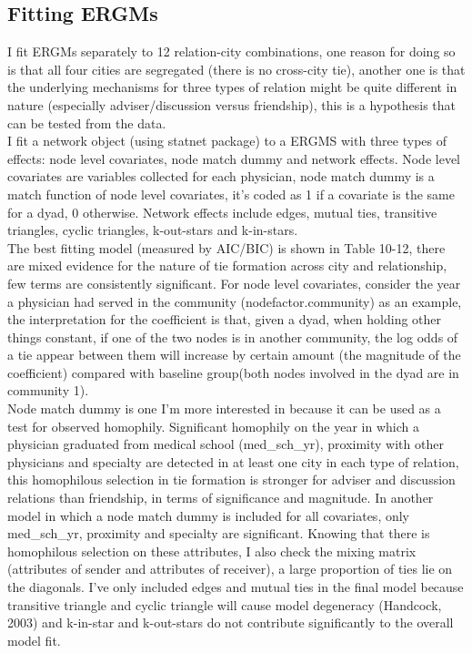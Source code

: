 \documentclass[11pt]{article}
\begin{document}
\subsection{Fitting ERGMs}

I fit ERGMs separately to 12 relation-city combinations, one reason for doing so is that all four cities are segregated (there is no cross-city tie), another one is that the underlying mechanisms for three types of relation might be quite different in nature (especially adviser/discussion versus friendship), this is a hypothesis that can be tested from the data.\\

I fit a network object (using statnet package) to a ERGMS with three types of effects: node level covariates, node match dummy and network effects. Node level covariates are variables collected for each physician, node match dummy is a match function of node level covariates, it's coded as 1 if a covariate is the same for a dyad, 0 otherwise. Network effects include edges, mutual ties, transitive triangles, cyclic triangles, k-out-stars and k-in-stars. \\

The best fitting model (measured by AIC/BIC) is shown in Table 10-12, there are mixed evidence for the nature of tie formation across city and relationship, few terms are consistently significant. For node level covariates, consider the year a physician had served in the community (nodefactor.community) as an example, the interpretation for the coefficient is that, given a dyad, when holding other things constant, if one of the two nodes is in another community, the log odds of a tie appear between them will increase by certain amount (the magnitude of the coefficient) compared with baseline group(both nodes involved in the dyad are in community 1). \\

Node match dummy is one I'm more interested in because it can be used as a test for observed homophily. Significant homophily on the year in which a physician graduated from medical school (med\_sch\_yr), proximity with other physicians and specialty are detected in at least one city in each type of relation, this homophilous selection in tie formation is stronger for adviser and discussion relations than friendship, in terms of significance and magnitude. In another model in which a node match dummy is included for all covariates, only med\_sch\_yr, proximity and specialty are significant. Knowing that there is homophilous selection on these attributes, I also check the mixing matrix (attributes of sender and attributes of receiver), a large proportion of ties lie on the diagonals. I've only included edges and mutual ties in the final model because transitive triangle and cyclic triangle will cause model degeneracy (Handcock, 2003) and k-in-star and k-out-stars do not contribute significantly to the overall model fit.\\
\end{document}
